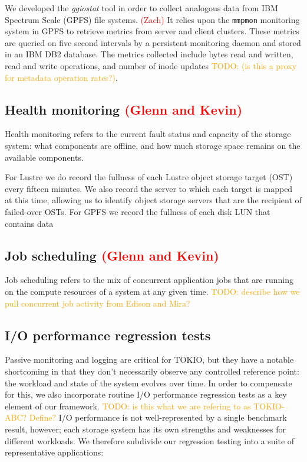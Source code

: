\documentclass[conference,10pt,compsocconf]{IEEEtran}
\newcommand{\assign}[1]{\textcolor{red}{(#1)}}
\newcommand{\todo}[1]{\textcolor{Orange}{TODO: #1}}
\begin{document}
\label{sec:methods/ggiostat}
We developed the \emph{ggiostat} tool in order to collect analogous data from
IBM Spectrum Scale (GPFS) file systems.  \assign{Zach}  It relies upon the
\texttt{mmpmon} monitoring system in GPFS to retrieve metrics from server and
client clusters.  These metrics are queried on five second intervals by a
persistent monitoring daemon and stored in an IBM DB2 database.
The metrics collected include bytes read and written,
read and write operations, and number of inode updates \todo{(is this
a proxy for metadata operation rates?)}.

\subsection{Health monitoring \assign{Glenn and Kevin}}
\label{sec:methods/health}

Health monitoring refers to the current fault status and capacity of the
storage system: what components are offline, and how much storage space
remains on the available components.

For Lustre we do record the fullness of each Lustre object storage target (OST) every fifteen minutes.  We also record the server to which each target is mapped at this time, allowing us to identify object storage servers that are the recipient of failed-over OSTs.  For GPFS we record the fullness of each disk LUN that contains data

\subsection{Job scheduling \assign{Glenn and Kevin}}

Job scheduling refers to the mix of concurrent application jobs that are
running on the compute resources of a system at any given time.
\todo{describe how we pull concurrent job activity from Edison and Mira?}

\subsection{I/O performance regression tests}

Passive monitoring and logging are critical for TOKIO, but they have a
notable shortcoming in that they don't necessarily observe any controlled
reference point: the workload and state of the system evolves over time.  In
order to compensate for this, we also incorporate routine I/O performance
regression tests as a key element of our framework.
\todo{is this what we are refering to as TOKIO-ABC?  Define?}  I/O
performance is not well-represented by a single benchmark result, however;
each storage system has its own strengths and weaknesses for different
workloads.  We therefore subdivide our regression testing into a suite of
representative applications:
\end{document}
